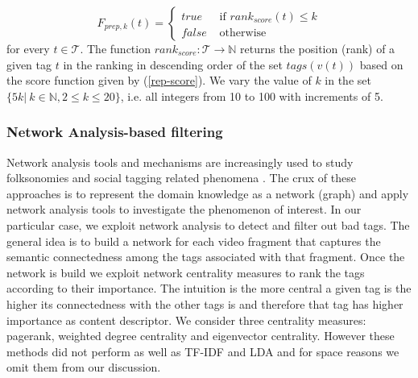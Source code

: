 \begin{equation}
F_{prep,k}(t) = \left\{ 
	\begin{array}{rl}
	true &\mbox{ if $rank_{score}(t) \leq k$} \\
	false &\mbox{ otherwise}
	\end{array}
\right.
\end{equation}
for every $t \in \mathcal{T}$. The function $rank_{score}: \mathcal{T} \rightarrow \mathbb{N}$ returns the  position (rank) of a given tag $t$ in the ranking in descending order of the set $tags(v(t))$ based on the score function given by (\ref{rep-score}). We vary the value of $k$ in the set $\{5k|~k\in \mathbb{N}, 2 \leq k \leq 20\}$, i.e. all integers from 10 to 100 with increments of 5.

\subsubsection{Network Analysis-based filtering}
Network analysis tools and mechanisms \cite{netan1,netan2} are increasingly used to study folksonomies and social tagging related phenomena \cite{jilung2011network,conf/csse/Wu08b,journals/corr/abs-cs-0509072,Mika:2007:OUU:1229184.1229195,ilprints775,conf/iics/BothorelB11}. The crux of these approaches is to  represent the domain knowledge as a network (graph) and apply network analysis tools to investigate the phenomenon of interest. In our particular case, we exploit network analysis to detect and filter out bad tags. The general idea is to build a network for each video fragment that captures the semantic connectedness among the tags associated with that fragment. Once the network is build we exploit network centrality measures to rank the tags according to their importance. The intuition is the more central a given tag is the higher its connectedness with the other tags is and therefore that tag has higher importance as content descriptor. We consider three centrality measures: pagerank, weighted degree centrality and eigenvector centrality. However these methods did not perform as well as TF-IDF and LDA and for space reasons we omit them from our discussion.  

